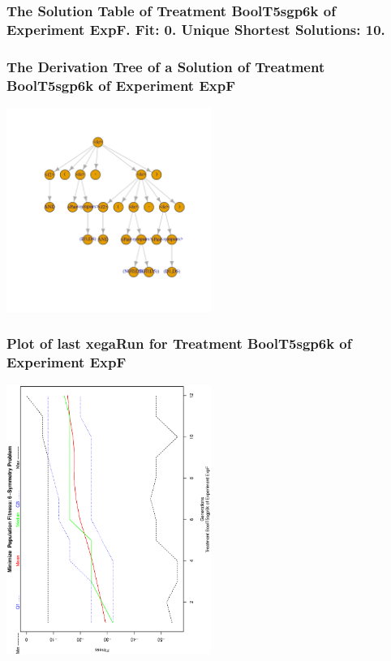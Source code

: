 \documentclass[18pt,c]{beamer}
\begin{document}
 \begin{frame}
 \fontsize{8pt}{9pt}\selectfont
 \frametitle{ The Solution Table of Treatment BoolT5sgp6k of Experiment ExpF. Fit: 0. Unique Shortest Solutions: 10. }

 \label{ExpFSolutionTable007.tex}  
 \end{frame}

 \begin{frame}
 \frametitle{ The Derivation Tree of a Solution of Treatment BoolT5sgp6k of Experiment ExpF }
 \begin{center}
\includegraphics[width=0.5\textwidth, angle=0]
{ExpFDerivationTreeFigure007.pdf}
 \end{center}
 \label{report/ExpFDerivationTreeFigure007.pdf}  
 \end{frame}

 \begin{frame}
 \frametitle{ Plot of last xegaRun for Treatment BoolT5sgp6k of Experiment ExpF }
 \begin{center}
\includegraphics[width=0.5\textwidth, angle=-90]
{ExpFPlotPopStatsFigure007.eps}
 \end{center}
 \label{report/ExpFPlotPopStatsFigure007.eps}  
 \end{frame}
\end{document}
